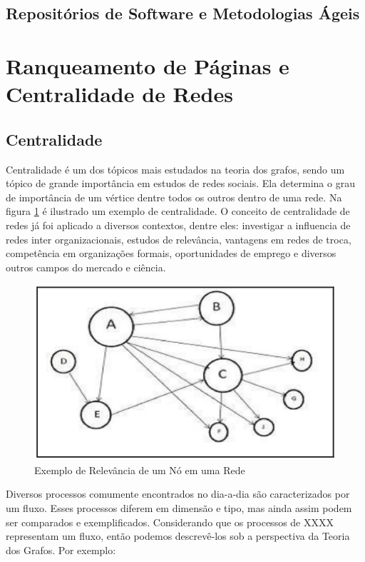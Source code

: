 \subsection{Repositórios de Software e Metodologias Ágeis}




\section{Ranqueamento de Páginas e Centralidade de Redes}
\label{ref:ran}

\subsection{Centralidade}
\label{ref:ran:cen}
Centralidade é um dos tópicos mais estudados na teoria dos grafos, sendo um tópico de grande importância em estudos de redes sociais. Ela determina o grau de importância de um vértice dentre todos os outros dentro de uma rede. Na figura \ref{fig:centrality} é ilustrado um exemplo de centralidade. O conceito de centralidade de redes já foi aplicado a diversos contextos, dentre eles: investigar a influencia de redes inter organizacionais, estudos de relevância, vantagens em redes de troca, competência em organizações formais, oportunidades de emprego e diversos outros campos do mercado e ciência\cite{centrality}.

\begin{figure}[!h]
    \centering
        \includegraphics[keepaspectratio=true,scale=0.5]{figuras/centrality.eps}
    \caption{Exemplo de Relevância de um Nó em uma Rede}
    \label{fig:centrality}
\end{figure}

Diversos processos comumente encontrados no dia-a-dia são caracterizados por um fluxo. Esses processos diferem em dimensão e tipo, mas ainda assim podem ser comparados e exemplificados. Considerando que os processos de XXXX representam um fluxo, então podemos descrevê-los sob a perspectiva da Teoria dos Grafos\cite{ceflow}. Por exemplo:

